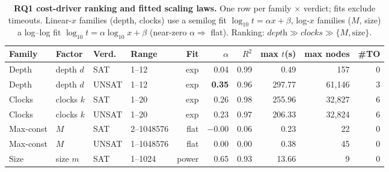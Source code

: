 \begin{table}[t]\centering
\caption{\textbf{RQ1 cost-driver ranking and fitted scaling laws.} One row per family $\times$ verdict; fits exclude timeouts. Linear-$x$ families (depth, clocks) use a semilog fit $\log_{10}t=\alpha x+\beta$, log-$x$ families ($M$, size) a log--log fit $\log_{10}t=\alpha\log_{10}x+\beta$ (near-zero $\alpha\Rightarrow$ flat). Ranking: $\textit{depth}\gg\textit{clocks}\gg\{M,\text{size}\}$.}\label{tab:perf-rq1}
\small\setlength{\tabcolsep}{4pt}
\begin{tabular}{llllrrrrrr}
\toprule
Family & Factor & Verd. & Range & Fit & $\alpha$ & $R^2$ & max $t$(s) & max nodes & \#TO \\
\midrule
Depth & depth $d$ & SAT & 1--12 & exp & 0.04 & 0.99 & 0.49 & 157 & 0 \\
Depth & depth $d$ & UNSAT & 1--12 & exp & \textbf{0.35} & 0.96 & 297.77 & 61{,}146 & 3 \\
Clocks & clocks $k$ & SAT & 1--20 & exp & 0.26 & 0.98 & 255.96 & 32{,}827 & 6 \\
Clocks & clocks $k$ & UNSAT & 1--20 & exp & 0.23 & 0.97 & 206.33 & 32{,}824 & 6 \\
Max-const & $M$ & SAT & 2--1048576 & flat & $-0.00$ & 0.06 & 0.23 & 22 & 0 \\
Max-const & $M$ & UNSAT & 1--1048576 & flat & 0.00 & 0.00 & 0.38 & 45 & 0 \\
Size & size $m$ & SAT & 1--1024 & power & 0.65 & 0.93 & 13.66 & 9 & 0 \\
\bottomrule
\end{tabular}
\end{table}
